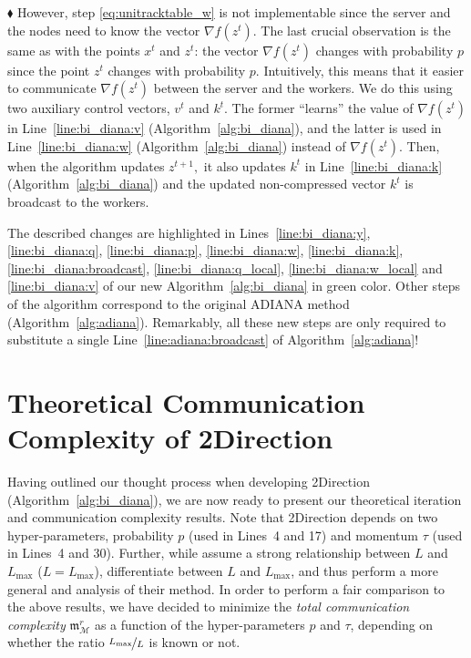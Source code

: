 \documentclass{article} %
\newcommand{\cM}{\mathcal{M}}
\theoremstyle{plain}
\theoremstyle{definition}
\theoremstyle{remark}
\newcommand{\green}{\color{mydarkgreen}}
\newcommand{\algname}[1]{{\small\green\sf #1}}
\begin{document}
$\blacklozenge$ However, step \eqref{eq:unitracktable_w} is not implementable since the server and the nodes need to know the vector $\nabla f(z^t).$ The last crucial observation is the same as with the points $x^t$ and $z^t$: the vector $\nabla f(z^t)$ changes with probability $p$ since the point $z^t$ changes with probability $p.$ Intuitively, this means that it easier to communicate $\nabla f(z^t)$ between the server and the workers. We do this using two auxiliary control vectors, $v^t$ and $k^t.$ The former ``learns'' the value of $\nabla f(z^t)$ in Line~\ref{line:bi_diana:v} (Algorithm~\ref{alg:bi_diana}), and the latter is used in Line~\ref{line:bi_diana:w} (Algorithm~\ref{alg:bi_diana}) instead of $\nabla f(z^t).$ Then, when the algorithm updates $z^{t+1},$ it also updates $k^t$ in Line~\ref{line:bi_diana:k} (Algorithm~\ref{alg:bi_diana}) and the updated non-compressed vector $k^t$ is broadcast to the workers.

The described changes are highlighted in Lines~\ref{line:bi_diana:y}, \ref{line:bi_diana:q}, \ref{line:bi_diana:p}, \ref{line:bi_diana:w}, \ref{line:bi_diana:k}, \ref{line:bi_diana:broadcast}, \ref{line:bi_diana:q_local}, \ref{line:bi_diana:w_local} and \ref{line:bi_diana:v} of our new Algorithm~\ref{alg:bi_diana} in {\green green} color. Other steps of the algorithm correspond to the original \algname{ADIANA} method (Algorithm~\ref{alg:adiana}). Remarkably, all these new steps are only required to substitute a single Line~\ref{line:adiana:broadcast} of Algorithm~\ref{alg:adiana}!




\section{Theoretical Communication Complexity of 2Direction}

Having outlined our thought process when developing  \algname{2Direction} (Algorithm~\ref{alg:bi_diana}), we are now ready to present our theoretical iteration and communication complexity results. Note that \algname{2Direction} depends on two hyper-parameters, probability $p$ (used in Lines~4 and 17) and momentum $\tau$ (used in Lines~4 and 30).
Further, while \citet{ADIANA, li2021canita} assume a strong relationship between  $L$ and $L_{\max}$ ($L=L_{\max}$),  \citet{gruntkowska2022ef21} differentiate between $L$ and $L_{\max}$, and thus perform a more general and analysis of their method. In order to perform a fair comparison to the above results, we have decided to minimize the {\em total communication complexity}   $\mathfrak{m}^{r}_{{\scriptscriptstyle \cM}}$ as a function of the hyper-parameters $p$ and $\tau$, depending on whether the ratio  $\nicefrac{L_{\max}}{L}$ is known or not.
\end{document}
